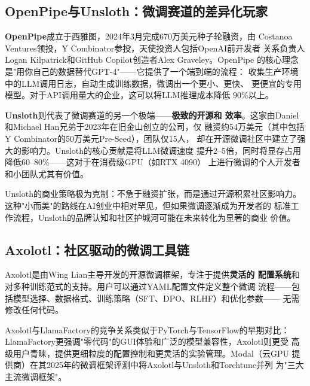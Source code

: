 \subsection{OpenPipe与Unsloth：微调赛道的差异化玩家}
\label{subsec:openpipe-unsloth}

\textbf{OpenPipe}成立于西雅图，2024年3月完成670万美元种子轮融资，由
Costanoa Ventures领投，Y Combinator参投，天使投资人包括OpenAI前开发者
关系负责人Logan Kilpatrick和GitHub Copilot创造者Alex Graveley。OpenPipe
的核心理念是"用你自己的数据替代GPT-4"——它提供了一个端到端的流程：
收集生产环境中的LLM调用日志，自动生成训练数据，微调出一个更小、更快、
更便宜的专用模型。对于API调用量大的企业，这可以将LLM推理成本降低
90\%以上。

\textbf{Unsloth}则代表了微调赛道的另一个极端——\textbf{极致的开源和
效率}。这家由Daniel和Michael Han兄弟于2023年在旧金山创立的公司，仅
融资约54万美元（其中包括Y Combinator的50万美元Pre-Seed），团队仅15人，
却在开源微调社区中建立了强大的影响力。Unsloth的核心贡献是将LLM微调速度
提升2--5倍，同时将显存占用降低60--80\%——这对于在消费级GPU（如RTX 4090）
上进行微调的个人开发者和小团队尤其有价值。

Unsloth的商业策略极为克制：不急于融资扩张，而是通过开源积累社区影响力。
这种"小而美"的路线在AI创业中相对罕见，但如果微调逐渐成为开发者的
标准工作流程，Unsloth的品牌认知和社区护城河可能在未来转化为显著的商业
价值。

\subsection{Axolotl：社区驱动的微调工具链}
\label{subsec:axolotl}

Axolotl是由Wing Lian主导开发的开源微调框架，专注于提供\textbf{灵活的
配置系统}和对多种训练范式的支持。用户可以通过YAML配置文件定义整个微调
流程——包括模型选择、数据格式、训练策略（SFT、DPO、RLHF）和优化参数——
无需修改任何代码。

Axolotl与LlamaFactory的竞争关系类似于PyTorch与TensorFlow的早期对比：
LlamaFactory更强调"零代码"的GUI体验和广泛的模型兼容性，Axolotl则更受
高级用户青睐，提供更细粒度的配置控制和更灵活的实验管理。Modal（云GPU
提供商）在其2025年的微调框架评测中将Axolotl与Unsloth和Torchtune并列
为"三大主流微调框架"。

